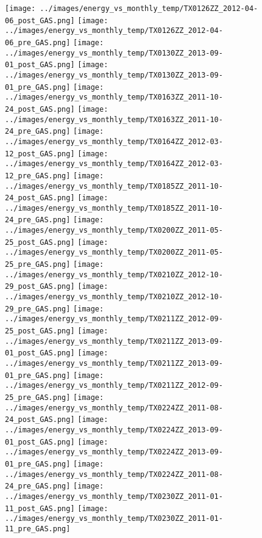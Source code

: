 \clearpage
\begin{figure}
\centering
\texttt{[image: ../images/energy\_vs\_monthly\_temp/TX0126ZZ\_2012-04-06\_post\_GAS.png]}
\texttt{[image: ../images/energy\_vs\_monthly\_temp/TX0126ZZ\_2012-04-06\_pre\_GAS.png]}
\texttt{[image: ../images/energy\_vs\_monthly\_temp/TX0130ZZ\_2013-09-01\_post\_GAS.png]}
\texttt{[image: ../images/energy\_vs\_monthly\_temp/TX0130ZZ\_2013-09-01\_pre\_GAS.png]}
\texttt{[image: ../images/energy\_vs\_monthly\_temp/TX0163ZZ\_2011-10-24\_post\_GAS.png]}
\texttt{[image: ../images/energy\_vs\_monthly\_temp/TX0163ZZ\_2011-10-24\_pre\_GAS.png]}
\texttt{[image: ../images/energy\_vs\_monthly\_temp/TX0164ZZ\_2012-03-12\_post\_GAS.png]}
\texttt{[image: ../images/energy\_vs\_monthly\_temp/TX0164ZZ\_2012-03-12\_pre\_GAS.png]}
\texttt{[image: ../images/energy\_vs\_monthly\_temp/TX0185ZZ\_2011-10-24\_post\_GAS.png]}
\texttt{[image: ../images/energy\_vs\_monthly\_temp/TX0185ZZ\_2011-10-24\_pre\_GAS.png]}
\texttt{[image: ../images/energy\_vs\_monthly\_temp/TX0200ZZ\_2011-05-25\_post\_GAS.png]}
\texttt{[image: ../images/energy\_vs\_monthly\_temp/TX0200ZZ\_2011-05-25\_pre\_GAS.png]}
\texttt{[image: ../images/energy\_vs\_monthly\_temp/TX0210ZZ\_2012-10-29\_post\_GAS.png]}
\texttt{[image: ../images/energy\_vs\_monthly\_temp/TX0210ZZ\_2012-10-29\_pre\_GAS.png]}
\texttt{[image: ../images/energy\_vs\_monthly\_temp/TX0211ZZ\_2012-09-25\_post\_GAS.png]}
\texttt{[image: ../images/energy\_vs\_monthly\_temp/TX0211ZZ\_2013-09-01\_post\_GAS.png]}
\texttt{[image: ../images/energy\_vs\_monthly\_temp/TX0211ZZ\_2013-09-01\_pre\_GAS.png]}
\texttt{[image: ../images/energy\_vs\_monthly\_temp/TX0211ZZ\_2012-09-25\_pre\_GAS.png]}
\texttt{[image: ../images/energy\_vs\_monthly\_temp/TX0224ZZ\_2011-08-24\_post\_GAS.png]}
\texttt{[image: ../images/energy\_vs\_monthly\_temp/TX0224ZZ\_2013-09-01\_post\_GAS.png]}
\texttt{[image: ../images/energy\_vs\_monthly\_temp/TX0224ZZ\_2013-09-01\_pre\_GAS.png]}
\texttt{[image: ../images/energy\_vs\_monthly\_temp/TX0224ZZ\_2011-08-24\_pre\_GAS.png]}
\texttt{[image: ../images/energy\_vs\_monthly\_temp/TX0230ZZ\_2011-01-11\_post\_GAS.png]}
\texttt{[image: ../images/energy\_vs\_monthly\_temp/TX0230ZZ\_2011-01-11\_pre\_GAS.png]}
\end{figure}
